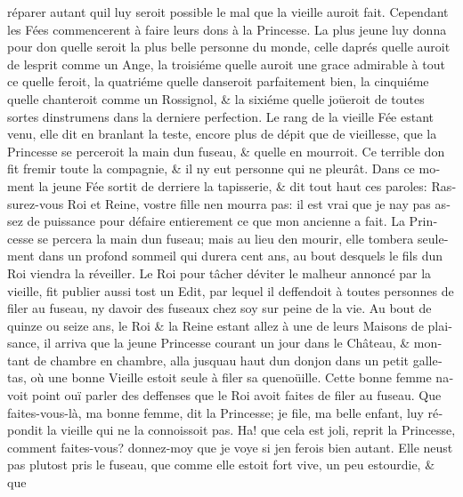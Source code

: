 \documentclass[14pt,a4paper]{memoir}
\begin{document}
\begin{otherlanguage}{french}
réparer autant qu\textquotesingle il luy seroit possible le mal que la
vieille auroit fait. Cependant les Fées commencerent à faire leurs dons
à la Princesse. La plus jeune luy donna pour don qu\textquotesingle elle
seroit la plus belle personne du monde, celle d\textquotesingle aprés
qu\textquotesingle elle auroit de l\textquotesingle esprit comme un
Ange, la troisiéme qu\textquotesingle elle auroit une grace admirable à
tout ce qu\textquotesingle elle feroit, la quatriéme
qu\textquotesingle elle danseroit parfaitement bien, la cinquiéme
qu\textquotesingle elle chanteroit comme un Rossignol, \& la sixiéme
qu\textquotesingle elle joüeroit de toutes sortes
d\textquotesingle instrumens dans la derniere perfection. Le rang de la
vieille Fée estant venu, elle dit en branlant la teste, encore plus de
dépit que de vieillesse, que la Princesse se perceroit la main
d\textquotesingle un fuseau, \& qu\textquotesingle elle en mourroit. Ce
terrible don fit fremir toute la compagnie, \& il n\textquotesingle y
eut personne qui ne pleurât. Dans ce moment la jeune Fée sortit de
derriere la tapisserie, \& dit tout haut ces paroles: Rassurez-vous Roi
et Reine, vostre fille n\textquotesingle en mourra pas: il est vrai que
je n\textquotesingle ay pas assez de puissance pour défaire entierement
ce que mon ancienne a fait. La Princesse se percera la main
d\textquotesingle un fuseau; mais au lieu d\textquotesingle en mourir,
elle tombera seulement dans un profond sommeil qui durera cent ans, au
bout desquels le fils d\textquotesingle un Roi viendra la réveiller. Le
Roi pour tâcher d\textquotesingle éviter le malheur annoncé par la
vieille, fit publier aussi tost un Edit, par lequel il deffendoit à
toutes personnes de filer au fuseau, ny d\textquotesingle avoir des
fuseaux chez soy sur peine de la vie. Au bout de quinze ou seize ans, le
Roi \& la Reine estant allez à une de leurs Maisons de plaisance, il
arriva que la jeune Princesse courant un jour dans le Château, \&
montant de chambre en chambre, alla jusqu\textquotesingle au haut
d\textquotesingle un donjon dans un petit galletas, où une bonne Vieille
estoit seule à filer sa quenoüille. Cette bonne femme
n\textquotesingle avoit point ouï parler des deffenses que le Roi avoit
faites de filer au fuseau. Que faites-vous-là, ma bonne femme, dit la
Princesse; je file, ma belle enfant, luy répondit la vieille qui ne la
connoissoit pas. Ha! que cela est joli, reprit la Princesse, comment
faites-vous? donnez-moy que je voye si j\textquotesingle en ferois bien
autant. Elle n\textquotesingle eust pas plutost pris le fuseau, que
comme elle estoit fort vive, un peu estourdie, \& que

\end{otherlanguage}
\end{document}
